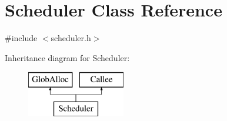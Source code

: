 \hypertarget{classScheduler}{\section{Scheduler Class Reference}
\label{classScheduler}
}


{\ttfamily \#include $<$scheduler.\-h$>$}

Inheritance diagram for Scheduler\-:\begin{figure}[H]
\begin{center}
\leavevmode
\includegraphics[height=2.000000cm]{classScheduler}
\end{center}
\end{figure}
